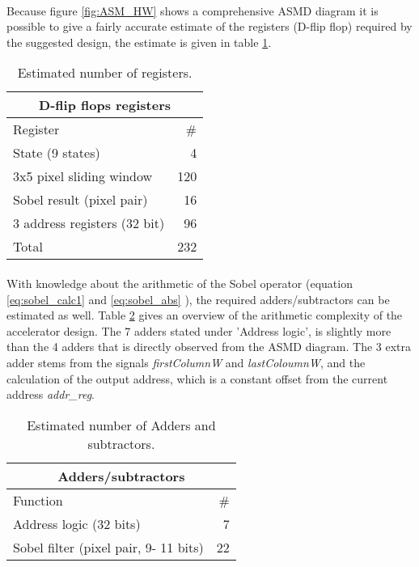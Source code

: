 \paragraph*{}
Because figure \ref{fig:ASM_HW} shows a comprehensive ASMD diagram it is possible to give a fairly accurate estimate of the registers (D-flip flop) required by the suggested design, the estimate is given in table \ref{tab:designRegisters}. 
\begin{table}[h]
	\centering
	\begin{tabular}{lr}
	\hline
	\multicolumn{2}{c}{D-flip flops registers} \\ \hline
	Register						& \# \\ \hline
	State (9 states)				& 4 \\
	3x5 pixel sliding window		& 120 \\
	Sobel result (pixel pair)		& 16 \\
	3 address registers (32 bit)	& 96 \\ \hline
	Total							& 232 \\ \hline
	\end{tabular}
	\caption{Estimated number of registers.}
	\label{tab:designRegisters}
\end{table}

\paragraph*{}
With knowledge about the arithmetic of the Sobel operator (equation \ref{eq:sobel_calc1} and \ref{eq:sobel_abs} ), the required adders/subtractors can be estimated as well.
Table \ref{tab:designAdders} gives an overview of the arithmetic complexity of the accelerator design. The 7 adders stated under 'Address logic', is slightly more than the 4 adders that is directly observed from the ASMD diagram.
The 3 extra adder stems from the signals \emph{firstColumnW} and \emph{lastColoumnW}, and the calculation of the output address, which is a constant offset from the current address \emph{addr\_reg}.
 
\begin{table}[h]
	\centering
	\begin{tabular}{lr}
	\hline
	\multicolumn{2}{c}{Adders/subtractors} \\ \hline
	Function						& \# \\ \hline
	Address logic (32 bits)			& 7 \\
	Sobel filter (pixel pair, 9- 11 bits)		& 22 \\  \hline
	\end{tabular}
	\caption{Estimated number of Adders and subtractors.}
	\label{tab:designAdders}
\end{table}

